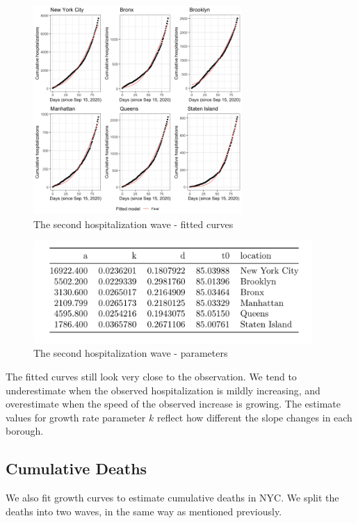 \documentclass[
]{article}
\begin{document}
\begin{figure}
\centering
\includegraphics[width=3.125in,height=\textheight]{plots/hosp_plots/no_start_curve/hosp_wave2_all.png}
\caption{The second hospitalization wave - fitted curves}
\end{figure}

\begin{figure}
\centering
\includegraphics[width=4.16667in,height=\textheight]{plots/hosp_plots/predictive/hosp_final_parameters.png}
\caption{The second hospitalization wave - parameters}
\end{figure}

The fitted curves still look very close to the observation. We tend to
underestimate when the observed hospitalization is mildly increasing,
and overestimate when the speed of the observed increase is growing. The
estimate values for growth rate parameter \(k\) reflect how different
the slope changes in each borough.

\hypertarget{cumulative-deaths}{%
\subsection{Cumulative Deaths}\label{cumulative-deaths}}

We also fit growth curves to estimate cumulative deaths in NYC. We split
the deaths into two waves, in the same way as mentioned previously.
\end{document}
